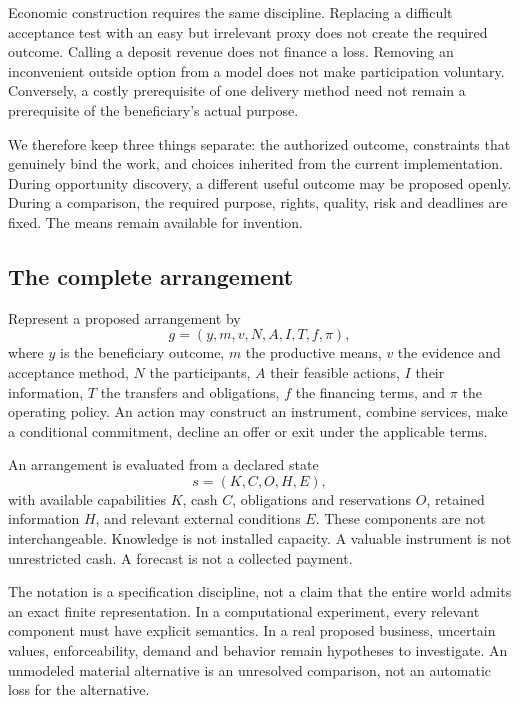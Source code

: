 Economic construction requires the same discipline. Replacing a difficult acceptance test with an easy but irrelevant proxy does not create the required outcome. Calling a deposit revenue does not finance a loss. Removing an inconvenient outside option from a model does not make participation voluntary. Conversely, a costly prerequisite of one delivery method need not remain a prerequisite of the beneficiary's actual purpose.

We therefore keep three things separate: the authorized outcome, constraints that genuinely bind the work, and choices inherited from the current implementation. During opportunity discovery, a different useful outcome may be proposed openly. During a comparison, the required purpose, rights, quality, risk and deadlines are fixed. The means remain available for invention.

\subsection{The complete arrangement}
Represent a proposed arrangement by
\begin{equation}
g=(y,m,v,N,A,I,T,f,\pi),
\end{equation}
where $y$ is the beneficiary outcome, $m$ the productive means, $v$ the evidence and acceptance method, $N$ the participants, $A$ their feasible actions, $I$ their information, $T$ the transfers and obligations, $f$ the financing terms, and $\pi$ the operating policy. An action may construct an instrument, combine services, make a conditional commitment, decline an offer or exit under the applicable terms.

An arrangement is evaluated from a declared state
\begin{equation}
s=(K,C,O,H,E),
\end{equation}
with available capabilities $K$, cash $C$, obligations and reservations $O$, retained information $H$, and relevant external conditions $E$. These components are not interchangeable. Knowledge is not installed capacity. A valuable instrument is not unrestricted cash. A forecast is not a collected payment.

The notation is a specification discipline, not a claim that the entire world admits an exact finite representation. In a computational experiment, every relevant component must have explicit semantics. In a real proposed business, uncertain values, enforceability, demand and behavior remain hypotheses to investigate. An unmodeled material alternative is an unresolved comparison, not an automatic loss for the alternative.

